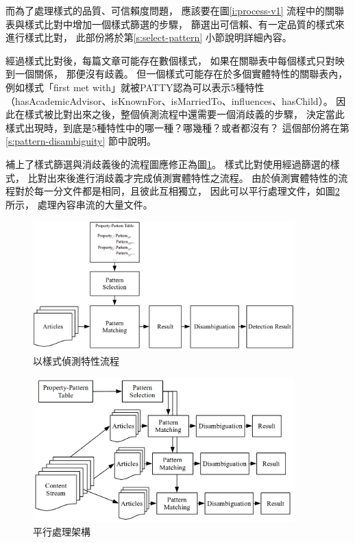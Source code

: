 而為了處理樣式的品質、可信賴度問題，
應該要在圖\ref{i:process-v1} 流程中的關聯表與樣式比對中增加一個樣式篩選的步驟，
篩選出可信賴、有一定品質的樣式來進行樣式比對，
此部份將於第\ref{s:select-pattern} 小節說明詳細內容。

經過樣式比對後，每篇文章可能存在數個樣式，
如果在關聯表中每個樣式只對映到一個關係，
那便沒有歧義。
但一個樣式可能存在於多個實體特性的關聯表內，
例如樣式「first met with」就被PATTY認為可以表示5種特性（hasAcademicAdvisor、isKnownFor、isMarriedTo、influences、hasChild）。
因此在樣式被比對出來之後，整個偵測流程中還需要一個消歧義的步驟，
決定當此樣式出現時，到底是5種特性中的哪一種？哪幾種？或者都沒有？
這個部份將在第\ref{s:pattern-disambiguity} 節中說明。

補上了樣式篩選與消歧義後的流程圖應修正為圖\ref{i:process-v2}。
樣式比對使用經過篩選的樣式，
比對出來後進行消歧義才完成偵測實體特性之流程。
由於偵測實體特性的流程對於每一分文件都是相同，且彼此互相獨立，
因此可以平行處理文件，如圖\ref{i:process-parallel} 所示，
處理內容串流的大量文件。

\begin{figure}
    \centering
    \includegraphics[width=0.9\textwidth]{images/03-process-v2}
    \caption{以樣式偵測特性流程}
    \label{i:process-v2}
\end{figure}

\begin{figure}
    \centering
    \includegraphics[width=0.9\textwidth]{images/03-pattern-parallel}
    \caption{平行處理架構}
    \label{i:process-parallel}
\end{figure}

